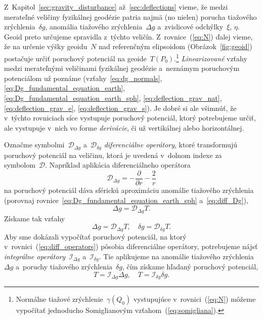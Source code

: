 \documentclass[a4paper,12pt]{book}
\newcommand{\DIFF}{\mathcal D}
\newcommand{\INT}{\mathcal I}
\begin{document}
Z~Kapitol~\ref{sec:gravity_disturbance} až~\ref{sec:deflections} vieme, že 
medzi merateľné veličiny fyzikálnej geodézie patria najmä (no nielen) porucha 
tiažového zrýchlenia~$\delta g$, anomália tiažového zrýchlenia~$\Delta g$ 
a~zvislicové odchýlky~$\xi$, $\eta$.  Geoid preto určujeme spravidla z~týchto 
veličín.  Z~rovnice~(\ref{eq:N}) ďalej vieme, že na určenie výšky geoidu~$N$ 
nad referenčným elipsoidom (Obrázok~\ref{fig:geoid}) postačuje určiť poruchový 
potenciál na geoide~$T(P_0)$.\footnote{Normálne tiažové 
zrýchlenie~$\gamma(Q_0)$ vystupujúce v~rovnici~(\ref{eq:N}) môžeme vypočítať 
jednoducho Somiglianovým vzťahom~(\ref{eq:somigliana}).}  \emph{Linearizované} 
vzťahy medzi merateľnými veličinami fyzikálnej geodézie a~neznámym poruchovým 
potenciálom už poznáme (vzťahy~\ref{eq:dg_normals}, 
\ref{eq:Dg_fundamental_equation_earth}, 
\ref{eq:Dg_fundamental_equation_earth_sph}, \ref{eq:deflection_grav_nat}, 
\ref{eq:deflection_grav_e}, \ref{eq:deflection_grav_s}).  Je dobré si ale 
všimnúť, že v~týchto rovniciach síce vystupuje poruchový potenciál, ktorý 
potrebujeme určiť, ale vystupuje v~nich vo forme \emph{derivácie}, či už 
vertikálnej alebo horizontálnej.

Označme symbolmi~$\DIFF_{\Delta g}$ a~$\DIFF_{\delta g}$ \emph{diferenciálne 
operátory}, ktoré transformujú poruchový potenciál na veličinu, ktorá je 
uvedená v~dolnom indexe za symbolom~$\DIFF$.  Napríklad aplikácia 
diferenciálneho operátora
%
\begin{equation}
\label{eq:diff_Dg}
\DIFF_{\Delta g} = -\frac{\partial}{\partial r} - \frac{2}{r}
\end{equation}
%
na poruchový potenciál dáva sférickú aproximáciu anomálie tiažového zrýchlenia 
(porovnaj rovnice~\ref{eq:Dg_fundamental_equation_earth_sph} 
a~\ref{eq:diff_Dg}),
%
\begin{equation}
\Delta g = \DIFF_{\Delta g} T{.}
\end{equation}
%
Získame tak vzťahy
%
\begin{equation}
\label{eq:diff_operators}
\Delta g = \DIFF_{\Delta g}T{,} \quad \delta g = \DIFF_{\delta g}T{.}
\end{equation}
%
Aby sme dokázali vypočítať poruchový potenciál, na ktorý 
v~rovnici~(\ref{eq:diff_operators}) pôsobia diferenciálne operátory, 
potrebujeme nájsť \emph{integrálne operátory}~$\INT_{\Delta g}$ a~$\INT_{\delta 
g}$.  Tie aplikujeme na anomálie tiažového zrýchlenia~$\Delta g$ a~poruchy 
tiažového zrýchlenia~$\delta g$, čím získame hľadaný poruchový potenciál,
%
\begin{equation}
\label{eq:int_operators}
T = \INT_{\Delta g} \Delta g{,} \quad T = \INT_{\delta g}\delta g{.}
\end{equation}
\end{document}
